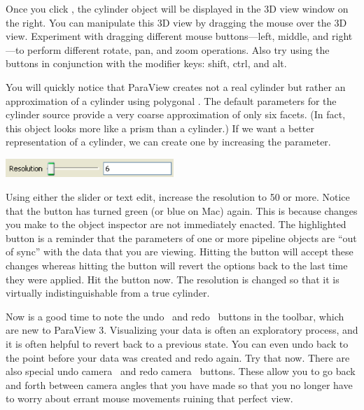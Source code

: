 Once you click , the cylinder object will be displayed in the 3D
view window on the right.  You can manipulate this 3D view by dragging the
mouse over the 3D view.  Experiment with dragging different mouse
buttons---left, middle, and right---to perform different rotate, pan, and
zoom operations.  Also try using the buttons in conjunction with the
modifier keys: shift, ctrl, and alt.

You will quickly notice that ParaView creates not a real cylinder but
rather an approximation of a cylinder using polygonal .
The default parameters for the cylinder source provide a very coarse
approximation of only six facets. (In fact, this object looks more like a
prism than a cylinder.) If we want a better representation of a cylinder,
we can create one by increasing the  parameter.

\begin{inlinefig}
  \includegraphics[width=2.5in]{images/ResolutionParameter}
\end{inlinefig}

Using either the slider or text edit, increase the resolution to 50 or
more.  Notice that the  button \apply has turned green (or blue
on Mac) again.  This is because changes you make to the object inspector
are not immediately enacted.  The highlighted button is a reminder that the
parameters of one or more pipeline objects are “out of sync” with the data
that you are viewing.  Hitting the  button will accept these
changes whereas hitting the  button \reset will revert the
options back to the last time they were applied.  Hit the 
button now.  The resolution is changed so that it is virtually
indistinguishable from a true cylinder.

Now is a good time to note the undo~ and
redo~ buttons in the toolbar, which are new to ParaView 3.
Visualizing your data is often an exploratory process, and it is often
helpful to revert back to a previous state.  You can even undo back to the
point before your data was created and redo again.  Try that now.  There
are also special undo camera~ and redo
camera~ buttons.  These allow you to go back and forth
between camera angles that you have made so that you no longer have to
worry about errant mouse movements ruining that perfect view.

